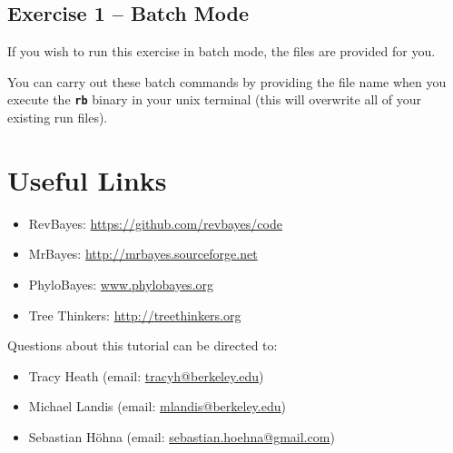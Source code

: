 \documentclass[11pt]{article}
\newcommand{\cl}[1]{{\texttt{\textbf{#1}}}}
\begin{document}
\bigskip
\subsection*{Exercise 1 -- Batch Mode}

If you wish to run this exercise in batch mode, the files are provided for you. 

You can carry out these batch commands by providing the file name when you execute the \cl{rb} binary in your unix terminal (this will overwrite all of your existing run files).
\exs{\cl{> rb full\_analysis.Rev}}

\bigskip
\section*{Useful Links}

\begin{itemize}
\item RevBayes: \href{https://github.com/revbayes/code}{https://github.com/revbayes/code} \\ \vspace{-7mm}
\item MrBayes: \href{http://mrbayes.sourceforge.net/}{http://mrbayes.sourceforge.net} \\ \vspace{-7mm}
\item PhyloBayes: \href{http://megasun.bch.umontreal.ca/People/lartillot/www/index.htm}{www.phylobayes.org} \\ \vspace{-7mm}
\item Tree Thinkers: \href{http://treethinkers.org/}{http://treethinkers.org} \\ \vspace{-7mm}
\end{itemize}

Questions about this tutorial can be directed to: \\\vspace{-10mm}
\begin{itemize}
\item Tracy Heath (email: \href{mailto:tracyh@berkeley.edu}{tracyh@berkeley.edu}) \\\vspace{-8mm}
\item Michael Landis (email: \href{mailto:mlandis@berkeley.edu}{mlandis@berkeley.edu}) \\\vspace{-8mm} 
\item Sebastian H\"{o}hna (email: \href{mailto:sebastian.hoehna@gmail.com}{sebastian.hoehna@gmail.com})
\end{itemize}
\end{document}
